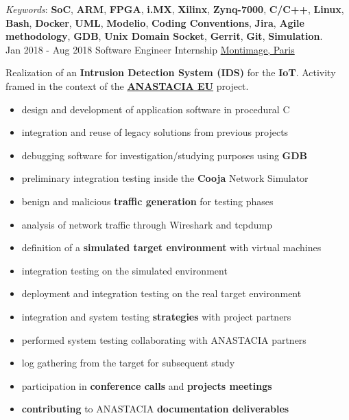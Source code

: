 \documentclass[letterpaper]{twentysecondcv} %
\begin{document}
\begin{twenty}
{            \textit{Keywords}: \textbf{SoC}, \textbf{ARM}, \textbf{FPGA}, \textbf{i.MX}, \textbf{Xilinx}, \textbf{Zynq-7000}, \textbf{C/C++}, \textbf{Linux}, \textbf{Bash}, \textbf{Docker}, \textbf{UML}, \textbf{Modelio}, \textbf{Coding Conventions}, \textbf{Jira}, \textbf{Agile methodology}, \textbf{GDB}, \textbf{Unix Domain Socket}, \textbf{Gerrit}, \textbf{Git}, \textbf{Simulation}.
        }\\
    \twentyitem
    	{Jan 2018 -}
		{Aug 2018}
        {Software Engineer Internship}
        {\href{https://www.montimage.com/}{Montimage, Paris}}
        {}
        {
            Realization of an \textbf{Intrusion Detection System (IDS)} for the \textbf{IoT}. Activity framed in the context of the \href{http://www.anastacia-h2020.eu/}{\textbf{ANASTACIA EU}} project.
            \begin{itemize}
                \item design and development of application software in procedural C
                \item integration and reuse of legacy solutions from previous projects
                \item debugging software for investigation/studying purposes using \textbf{GDB}
                \item preliminary integration testing inside the \textbf{Cooja} Network Simulator
                \item benign and malicious \textbf{traffic generation} for testing phases
                \item analysis of network traffic through Wireshark and tcpdump
                \item definition of a \textbf{simulated target environment} with virtual machines
                \item integration testing on the simulated environment
                \item deployment and integration testing on the real target environment
                \item integration and system testing \textbf{strategies} with project partners
                \item performed system testing collaborating with ANASTACIA partners
                \item log gathering from the target for subsequent study
                \item participation in \textbf{conference calls} and \textbf{projects meetings}
                \item \textbf{contributing} to ANASTACIA \textbf{documentation deliverables}

\end{itemize}}
\end{twenty}
\end{document}
